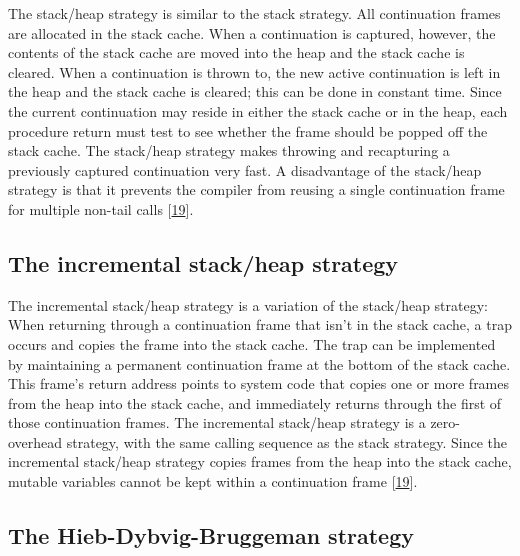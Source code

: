 \documentclass[12pt,a4paper,oneside,openright]{book}
\begin{document}
The stack/heap strategy is similar to the stack strategy. All
continuation frames are allocated in the stack cache. When a
continuation is captured, however, the contents of the stack cache are
moved into the heap and the stack cache is cleared. When a continuation
is thrown to, the new active continuation is left in the heap and the
stack cache is cleared; this can be done in constant time. Since the
current continuation may reside in either the stack cache or in the
heap, each procedure return must test to see whether the frame should be
popped off the stack cache. The stack/heap strategy makes throwing and
recapturing a previously captured continuation very fast. A disadvantage
of the stack/heap strategy is that it prevents the compiler from reusing
a single continuation frame for multiple non-tail calls
{[}\hyperref[ref-Clinger1999]{19}{]}.

\subsection{The incremental stack/heap
strategy}\label{the-incremental-stackheap-strategy}

The incremental stack/heap strategy is a variation of the stack/heap
strategy: When returning through a continuation frame that isn't in the
stack cache, a trap occurs and copies the frame into the stack cache.
The trap can be implemented by maintaining a permanent continuation
frame at the bottom of the stack cache. This frame's return address
points to system code that copies one or more frames from the heap into
the stack cache, and immediately returns through the first of those
continuation frames. The incremental stack/heap strategy is a
zero-overhead strategy, with the same calling sequence as the stack
strategy. Since the incremental stack/heap strategy copies frames from
the heap into the stack cache, mutable variables cannot be kept within a
continuation frame {[}\hyperref[ref-Clinger1999]{19}{]}.

\subsection{The Hieb-Dybvig-Bruggeman
strategy}\label{the-hieb-dybvig-bruggeman-strategy}
\end{document}
